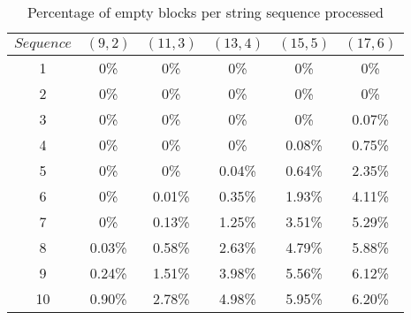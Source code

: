 \begin{table}[h] %
	\renewcommand{\arraystretch}{1.3}
	\caption{Percentage of empty blocks per string sequence processed}
	\label{tbl:empty_blocks}
	\centering
	\begin{tabular}{|c|c|c|c|c|c|}
		\hline 
		\bfseries\boldmath $Sequence$ & 
		\bfseries\boldmath $(9,2)$ & 
		\bfseries\boldmath $(11,3)$ & 
		\bfseries\boldmath $(13,4)$ & 
		\bfseries\boldmath $(15,5)$ & 
		\bfseries\boldmath $(17,6)$ \\
		\hline
			1	& 	0\%		& 	0\%		& 	0\%		&	0\%		& 	0\%\\
			2	& 	0\%		& 	0\%		& 	0\%		&	0\% 	& 	0\%\\
			3	& 	0\%		& 	0\%		& 	0\%		&	0\% 	& 	0.07\%\\
			4	& 	0\%		& 	0\%		& 	0\% 	&	0.08\% 	& 	0.75\%\\
			5	& 	0\%		& 	0\% 	&	0.04\%	&	0.64\%	&	2.35\%\\
			6	& 	0\%		& 	0.01\%	& 	0.35\%	&	1.93\%	&	4.11\%\\
			7	& 	0\%		& 	0.13\%	& 	1.25\%	&	3.51\%	&	5.29\%\\
			8	& 	0.03\% 	&	0.58\%	& 	2.63\%	&	4.79\%	&	5.88\%\\
			9	& 	0.24\% 	& 	1.51\%	& 	3.98\%	&	5.56\%	&	6.12\%\\
			10	& 	0.90\% 	&	2.78\%	& 	4.98\%	&	5.95\%	&	6.20\%\\
		\hline\end{tabular}
\end{table}
